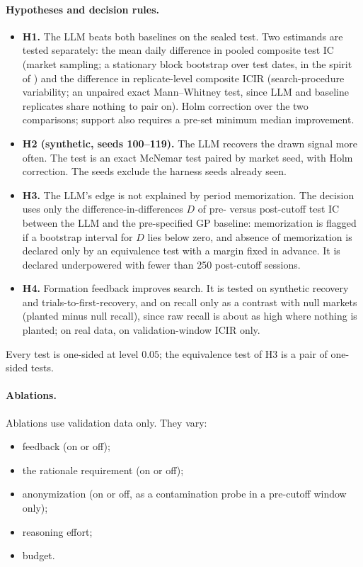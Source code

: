 \paragraph{Hypotheses and decision rules.}
\begin{itemize}
  \item \textbf{H1.} The LLM beats both baselines on the sealed test. Two
    estimands are tested separately: the mean daily difference in pooled
    composite test IC (market sampling; a stationary block bootstrap over
    test dates, in the spirit of \citet{hansen2005spa}) and the difference in
    replicate-level composite ICIR (search-procedure variability; an
    unpaired exact Mann--Whitney test, since LLM and baseline replicates share
    nothing to pair on). Holm correction over the two comparisons; support
    also requires a pre-set minimum median improvement.
  \item \textbf{H2 (synthetic, seeds 100--119).} The LLM recovers the drawn
    signal more often. The test is an exact McNemar test paired by market
    seed, with Holm correction. The seeds exclude the harness seeds already
    seen.
  \item \textbf{H3.} The LLM's edge is not explained by period memorization.
    The decision uses only the difference-in-differences $D$ of pre- versus
    post-cutoff test IC between the LLM and the pre-specified GP baseline:
    memorization is flagged if a bootstrap interval for $D$ lies below zero,
    and absence of memorization is declared only by an equivalence test with
    a margin fixed in advance. It is declared underpowered with fewer than
    250 post-cutoff sessions.
  \item \textbf{H4.} Formation feedback improves search. It is tested on
    synthetic recovery and trials-to-first-recovery, and on recall only as a
    contrast with null markets (planted minus null recall), since raw recall
    is about as high where nothing is planted; on real data, on
    validation-window ICIR only.
\end{itemize}
Every test is one-sided at level $0.05$; the equivalence test of H3 is a pair of one-sided tests.

\paragraph{Ablations.} Ablations use validation data only. They vary:
\begin{itemize}
  \item feedback (on or off);
  \item the rationale requirement (on or off);
  \item anonymization (on or off, as a contamination probe in a pre-cutoff
    window only);
  \item reasoning effort;
  \item budget.
\end{itemize}

